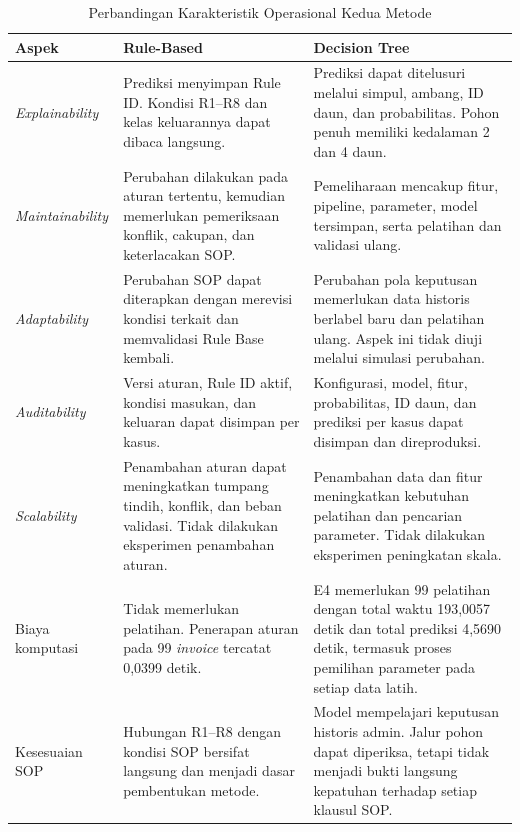\begin{table}[htbp]
    \centering
    \caption{Perbandingan Karakteristik Operasional Kedua Metode}
    \label{tab:karakteristik-operasional-bab-empat}
    \scriptsize
    \renewcommand{\arraystretch}{1.2}
    \begin{tabularx}{\textwidth}{p{}p{}X}
        \toprule
        \textbf{Aspek} & \textbf{Rule-Based} & \textbf{Decision Tree} \\
        \midrule
        \textit{Explainability} & Prediksi menyimpan Rule ID. Kondisi R1--R8 dan kelas keluarannya dapat dibaca langsung. & Prediksi dapat ditelusuri melalui simpul, ambang, ID daun, dan probabilitas. Pohon penuh memiliki kedalaman 2 dan 4 daun. \\
        \textit{Maintainability} & Perubahan dilakukan pada aturan tertentu, kemudian memerlukan pemeriksaan konflik, cakupan, dan keterlacakan SOP. & Pemeliharaan mencakup fitur, pipeline, parameter, model tersimpan, serta pelatihan dan validasi ulang. \\
        \textit{Adaptability} & Perubahan SOP dapat diterapkan dengan merevisi kondisi terkait dan memvalidasi Rule Base kembali. & Perubahan pola keputusan memerlukan data historis berlabel baru dan pelatihan ulang. Aspek ini tidak diuji melalui simulasi perubahan. \\
        \textit{Auditability} & Versi aturan, Rule ID aktif, kondisi masukan, dan keluaran dapat disimpan per kasus. & Konfigurasi, model, fitur, probabilitas, ID daun, dan prediksi per kasus dapat disimpan dan direproduksi. \\
        \textit{Scalability} & Penambahan aturan dapat meningkatkan tumpang tindih, konflik, dan beban validasi. Tidak dilakukan eksperimen penambahan aturan. & Penambahan data dan fitur meningkatkan kebutuhan pelatihan dan pencarian parameter. Tidak dilakukan eksperimen peningkatan skala. \\
        Biaya komputasi & Tidak memerlukan pelatihan. Penerapan aturan pada 99 \textit{invoice} tercatat 0,0399 detik. & E4 memerlukan 99 pelatihan dengan total waktu 193,0057 detik dan total prediksi 4,5690 detik, termasuk proses pemilihan parameter pada setiap data latih. \\
        Kesesuaian SOP & Hubungan R1--R8 dengan kondisi SOP bersifat langsung dan menjadi dasar pembentukan metode. & Model mempelajari keputusan historis admin. Jalur pohon dapat diperiksa, tetapi tidak menjadi bukti langsung kepatuhan terhadap setiap klausul SOP. \\
        \bottomrule
    \end{tabularx}
\end{table}

